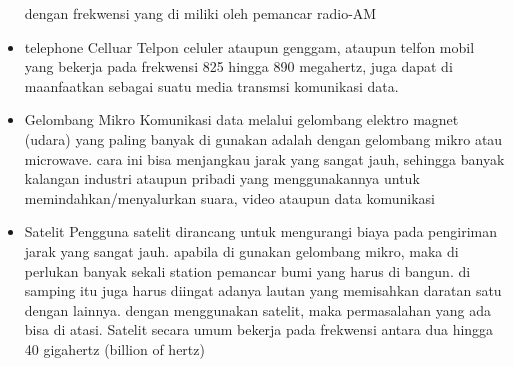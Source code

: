 \begin{itemize}
        dengan frekwensi yang di miliki oleh pemancar radio-AM
  \item telephone Celluar
        Telpon celuler ataupun genggam, ataupun telfon mobil yang bekerja pada frekwensi 825 hingga 890 megahertz, juga dapat di maanfaatkan sebagai suatu media transmsi komunikasi data.
  \item Gelombang Mikro
        Komunikasi data melalui gelombang elektro magnet (udara)
        yang paling banyak di gunakan adalah dengan gelombang mikro atau microwave. cara ini bisa menjangkau jarak yang sangat jauh, sehingga banyak kalangan industri ataupun pribadi yang menggunakannya untuk memindahkan/menyalurkan suara, video ataupun data komunikasi
  \item Satelit
        Pengguna satelit dirancang untuk mengurangi biaya pada pengiriman jarak yang sangat jauh. apabila di gunakan gelombang mikro, maka di perlukan banyak sekali station pemancar bumi yang harus di bangun. di samping itu juga
        harus diingat adanya lautan yang memisahkan daratan satu
        dengan lainnya. dengan menggunakan satelit, maka permasalahan yang ada bisa di atasi. Satelit secara umum
        bekerja pada frekwensi antara dua hingga 40 gigahertz
        (billion of hertz)
  \end{itemize}